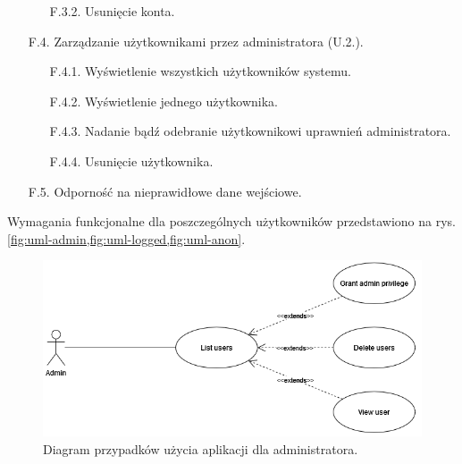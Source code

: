 \documentclass[a4paper,twoside,12pt]{book}
\begin{document}
\begin{itemize}
\begin{itemize}
		\item [F.3.2.] Usunięcie konta.
	\end{itemize}
	\item [F.4.] Zarządzanie użytkownikami przez administratora (U.2.).
	\begin{itemize}
		\item [F.4.1.] Wyświetlenie wszystkich użytkowników systemu.
		\item [F.4.2.] Wyświetlenie jednego użytkownika.
		\item [F.4.3.] Nadanie bądź odebranie użytkownikowi uprawnień administratora.
		\item [F.4.4.] Usunięcie użytkownika.
	\end{itemize}
	\item [F.5.] Odporność na nieprawidłowe dane wejściowe.
\end{itemize}

Wymagania funkcjonalne dla poszczególnych użytkowników przedstawiono na rys. \ref{fig:uml-admin,fig:uml-logged,fig:uml-anon}.

\begin{figure}
\centering
\includegraphics{./UML-Admin.png}
\caption{Diagram przypadków użycia aplikacji dla administratora.}
\label{fig:uml-admin}
\end{figure}
\end{document}

